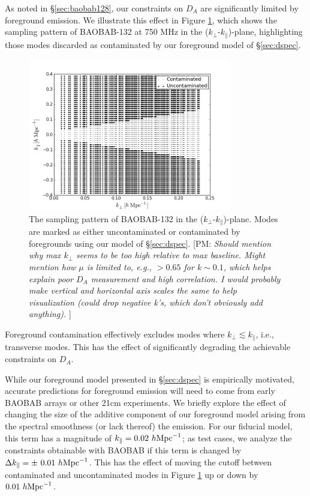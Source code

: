 \documentclass[10pt,iop]{emulateapj}
\def\pvm#1{[PM: {\it #1}] }
\begin{document}
As noted in \S\ref{sec:baobab128}, our constraints on $D_A$ are significantly limited by foreground
emission.  We illustrate this effect in Figure \ref{fig:fgloss}, which shows the sampling pattern
of BAOBAB-132 at 750 MHz in the ($k_{\perp}$-$k_{\parallel}$)-plane, highlighting those modes 
discarded as contaminated by our foreground model of \S\ref{sec:dspec}.  
\begin{figure}\centering
\includegraphics[width=3.5in]{fgloss.png}
\caption{The sampling pattern of BAOBAB-132 in the 
($k_{\perp}$-$k_{\parallel}$)-plane.  Modes are 
marked as either uncontaminated or 
contaminated by foregrounds using our model of \S\ref{sec:dspec}.
\pvm{Should mention why max $k_\perp$ seems to be too high relative to max
baseline. Might mention how $\mu$ is limited to, e.g., $>0.65$ for 
$k\sim 0.1$, which helps explain poor $D_A$ measurement and high correlation.
I would probably make vertical and horizontal axis scales the same to help
visualization (could drop negative k's, which don't obviously add anything). }
} \label{fig:fgloss}
\end{figure}
Foreground
contamination effectively excludes modes where $k_{\perp} \lesssim k_{\parallel}$, i.e., transverse
modes.  This has the effect of significantly degrading the achievable constraints on $D_A$.

While our foreground model presented in \S\ref{sec:dspec} is empirically motivated, 
accurate predictions for foreground emission
will need to come from early BAOBAB arrays or other 21cm experiments.  We briefly explore the effect
of changing the size of the additive component of our foreground model arising from the
spectral smoothness (or lack thereof) the emission.  For our fiducial model, this term has a
magnitude of $k_{\parallel} = 0.02~h{\rm Mpc}^{-1}$; as test cases, we analyze the constraints
obtainable with BAOBAB if this term is changed by $\Delta k_{\parallel} = 
\pm~0.01~h{\rm Mpc}^{-1}$.  
This has the effect of moving the cutoff between contaminated and uncontaminated modes in Figure
\ref{fig:fgloss} up or down by $0.01~h{\rm Mpc}^{-1}$.
\end{document}
